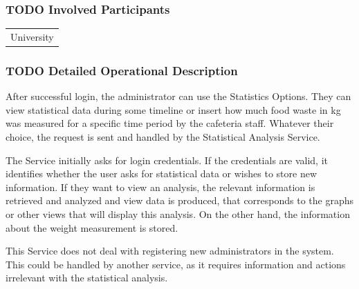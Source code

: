 \documentclass[11pt]{article}
\begin{document}
\subsubsection{{\bfseries\sffamily TODO} Involved Participants}
\label{sec:org067b94b}
\begin{center}
\begin{tabular}{l}
University\\
\end{tabular}
\end{center}
\subsubsection{{\bfseries\sffamily TODO} Detailed Operational Description}
\label{sec:org4bf3343}
After successful login, the administrator can use the Statistics
Options. They can view statistical data during some timeline or
insert how much food waste in kg was measured for a specific time
period by the cafeteria staff. Whatever their choice, the request
is sent and handled by the Statistical Analysis Service.

The Service initially asks for login credentials. If the
credentials are valid, it identifies whether the user asks for
statistical data or wishes to store new information. If they want
to view an analysis, the relevant information is retrieved and
analyzed and view data is produced, that corresponds to the graphs
or other views that will display this analysis. On the other hand,
the information about the weight measurement is stored.

This Service does not deal with registering new administrators in
the system. This could be handled by another service, as it
requires information and actions irrelevant with the statistical
analysis.
\end{document}
